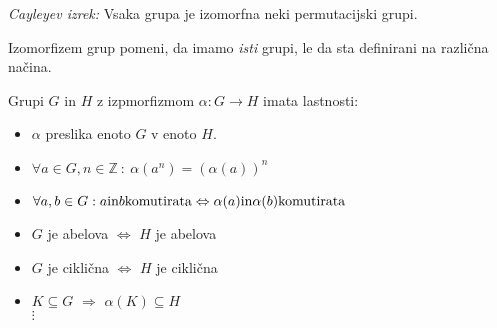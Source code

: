 \documentclass[a4paper,9pt]{extarticle}
\begin{document}
\begin{multicols}{3}
\emph{Cayleyev izrek:} Vsaka grupa je izomorfna neki permutacijski grupi.

Izomorfizem grup pomeni, da imamo \emph{isti} grupi, le da sta definirani na različna načina.

Grupi $G$ in $H$ z izpmorfizmom $\alpha: G \to H$ imata lastnosti:
\begin{itemize}
    \item $\alpha$ preslika enoto $G$ v enoto $H$.
    \item $\forall a \in G, n \in \mathbb{Z}\ :\ \alpha(a^n) = \left( \alpha(a) \right)^n$
    \item $\forall a,b \in G : a \textmd{in} b \textmd{komutirata} \Leftrightarrow \alpha(a) \textmd{in} \alpha(b) \textmd{komutirata}$
    \item $G$ je abelova $\Leftrightarrow$ $H$ je abelova
    \item $G$ je ciklična $\Leftrightarrow$ $H$ je ciklična
    \item $K \subseteq G$ $\Rightarrow$ $\alpha(K) \subseteq H$\\
    $\vdots$
\end{itemize}

\end{multicols}
\end{document}
